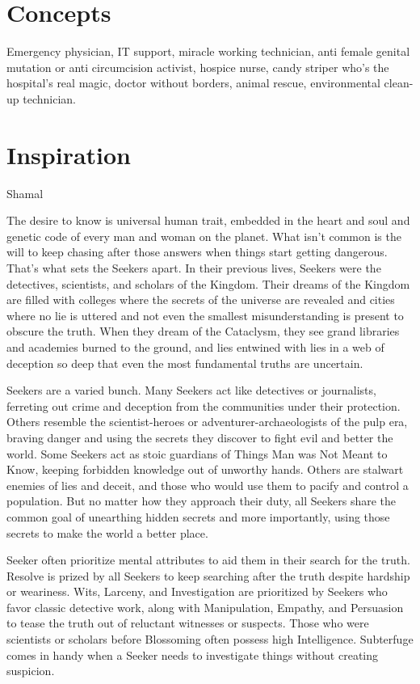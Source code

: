 \section*{Concepts}
Emergency physician, IT support, miracle working technician, anti female genital mutation or anti circumcision activist, hospice nurse, candy striper who's the hospital's real magic, doctor without borders, animal rescue, environmental clean-up technician. 

\section*{Inspiration}

Shamal

\newpage{}

The desire to know is universal human trait, embedded in the heart and soul and genetic code of every man and woman on the planet. What isn't common is the will to keep chasing after those answers when things start getting dangerous. That's what sets the Seekers apart. In their previous lives, Seekers were the detectives, scientists, and scholars of the Kingdom. Their dreams of the Kingdom are filled with colleges where the secrets of the universe are revealed and cities where no lie is uttered and not even the smallest misunderstanding is present to obscure the truth. When they dream of the Cataclysm, they see grand libraries and academies burned to the ground, and lies entwined with lies in a web of deception so deep that even the most fundamental truths are uncertain.

Seekers are a varied bunch. Many Seekers act like detectives or journalists, ferreting out crime and deception from the communities under their protection. Others resemble the scientist-heroes or adventurer-archaeologists of the pulp era, braving danger and using the secrets they discover to fight evil and better the world. Some Seekers act as stoic guardians of Things Man was Not Meant to Know, keeping forbidden knowledge out of unworthy hands. Others are stalwart enemies of lies and deceit, and those who would use them to pacify and control a population. But no matter how they approach their duty, all Seekers share the common goal of unearthing hidden secrets and more importantly, using those secrets to make the world a better place.

Seeker often prioritize mental attributes to aid them in their search for the truth. Resolve is prized by all Seekers to keep searching after the truth despite hardship or weariness. Wits, Larceny, and Investigation are prioritized by Seekers who favor classic detective work, along with Manipulation, Empathy, and Persuasion to tease the truth out of reluctant witnesses or suspects. Those who were scientists or scholars before Blossoming often possess high Intelligence. Subterfuge comes in handy when a Seeker needs to investigate things without creating suspicion.

